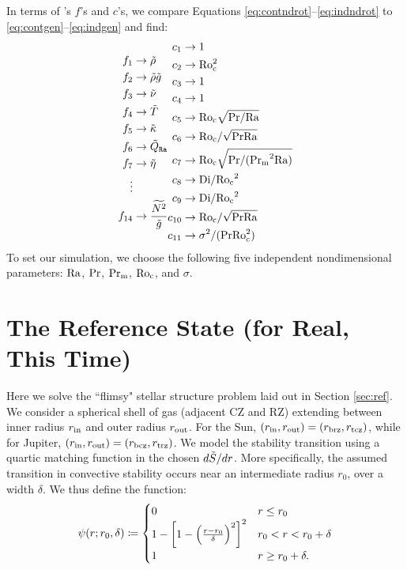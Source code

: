 \documentclass[12pt]{article}
\numberwithin{equation}{section}
\begin{document}
In terms of {\rayleigh}'s $f$'s and $c$'s, we compare Equations \eqref{eq:contndrot}--\eqref{eq:indndrot} to \eqref{eq:contgen}--\eqref{eq:indgen} and find:
\begin{align*}
	\begin{split}
	f_1&\rightarrow \tilde{\rho}\\
	f_2&\rightarrow\tilde{\rho}\tilde{g} \\
	f_3 &\rightarrow \tilde{\nu}\\
	f_4 &\rightarrow \tilde{T}\\
	f_5 &\rightarrow \tilde{\kappa}\\
	f_6 &\rightarrow \tilde{Q}_{\texttt{Ra}}\\
	f_7 &\rightarrow \tilde{\eta}\\
	\vdots\\
	f_{14} &\rightarrow \frac{\widetilde{N^2}}{\tilde{g}}
\end{split}
\begin{split}
c_1 &\rightarrow 1\\
c_2 &\rightarrow {\rm{Ro_c^2}}\\
c_3 &\rightarrow 1\\
c_4 &\rightarrow 1\\
c_5 &\rightarrow {\rm{Ro_c}}\sqrt{{\rm{Pr}}/{\rm{Ra}}}\\
c_6 &\rightarrow {\rm{Ro_c}}/\sqrt{{\rm{Pr}}{\rm{Ra}}}\\
c_7 &\rightarrow {\rm{Ro_c}}\sqrt{{\rm{Pr}}/({\rm{Pr_m}}^2{\rm{Ra}})}\\
c_8 &\rightarrow {\rm{Di}}/{\rm{Ro_c}}^2\\
c_9 &\rightarrow {\rm{Di}}/{\rm{Ro_c}}^2\\
c_{10} &\rightarrow {\rm{Ro_c}}/\sqrt{{\rm{Pr}}{\rm{Ra}}}\\
c_{11} &\rightarrow \sigma^2/({\rm{Pr}}{\rm{Ro_c^2}})
\end{split}
\end{align*}
To set our simulation,
 we choose the following five independent nondimensional parameters: ${\rm{Ra}}$, ${\rm{Pr}}$, ${\rm{Pr_m}}$, ${\rm{Ro_c}}$, and $\sigma$. 

\section{The Reference State (for Real, This Time)}\label{sec:ref2}
Here we solve the ``flimsy" stellar structure problem laid out in Section \ref{sec:ref}. We consider a spherical shell of gas (adjacent CZ and RZ) extending between inner radius $r_{\rm{in}}$ and outer radius $r_{\rm{out}}$. For the Sun, $(r_{\rm{in}},r_{\rm{out}})=(r_{\rm brz},r_{\rm tcz})$, while for Jupiter, $(r_{\rm{in}},r_{\rm{out}})=(r_{\rm bcz},r_{\rm trz})$. We model the stability transition using a quartic matching function in the chosen $d\tilde{S}/dr$. More specifically, the assumed transition in convective stability occurs near an intermediate radius $r_0$, over a width $\delta$. We thus define the function:
\begin{equation}
  \psi(r;r_0, \delta)\coloneqq \begin{cases}
		0 & r\leq r_0 \\
		1 - \left[1 - \Big{(}\frac{r-r_0}{\delta}\Big{)}^2\right]^2 & r_0  < r < r_0+ \delta\\
		1 & r\geq r_0+\delta.
	\end{cases}
	\label{eq:psi}
\end{equation}
\end{document}
